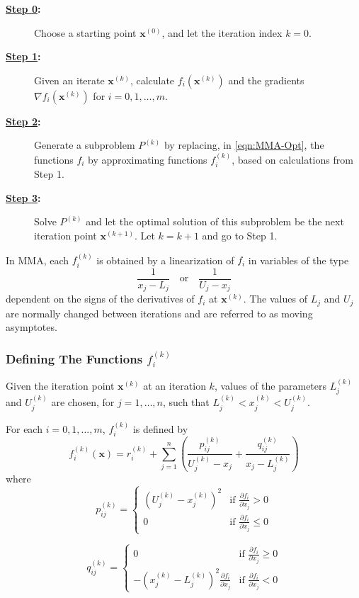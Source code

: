 \begin{description}
	\item[\textbf{\underline{Step 0}:}] Choose a starting point $\mathbf{x}^{(0)}$, and let the iteration index $k=0$.
	\item[\textbf{\underline{Step 1}:}] Given an iterate $\mathbf{x}^{(k)}$, calculate $f_i(\mathbf{x}^{(k)})$ and the gradients $\nabla f_i(\mathbf{x}^{(k)})$ for $i=0,1,\ldots,m$.
	\item[\textbf{\underline{Step 2}:}] Generate a subproblem $P^{(k)}$ by replacing, in \eqref{eqn:MMA-Opt}, the functions $f_i$ by approximating functions $f_i^{(k)}$, based on calculations from Step 1.
	\item[\textbf{\underline{Step 3}:}] Solve $P^{(k)}$ and let the optimal solution of this subproblem be the next iteration point $\mathbf{x}^{(k+1)}$. Let $k=k+1$ and go to Step 1.
\end{description}

In MMA, each $f_i^{(k)}$ is obtained by a linearization of $f_i$ in variables of the type $$\frac{1}{x_j-L_j}\quad\text{or}\quad\frac{1}{U_j-x_j}$$ dependent on the signs of the derivatives of $f_i$ at $\mathbf{x}^{(k)}$. The values of $L_j$ and $U_j$ are normally changed between iterations and are referred to as moving asymptotes.

\subsubsection*{Defining The Functions $f_i^{(k)}$}

Given the iteration point $\mathbf{x}^{(k)}$ at an iteration $k$, values of the parameters $L_j^{(k)}$ and $U_j^{(k)}$ are chosen, for $j=1,\ldots,n$, such that $L_j^{(k)}<x_j^{(k)}<U_j^{(k)}$.


For each $i=0,1,\ldots,m$, $f_i^{(k)}$ is defined by $$f_i^{(k)}(\mathbf{x})=r_i^{(k)}+\sum\limits_{j=1}^{n}\left(\frac{p_{ij}^{(k)}}{U_j^{(k)}-x_j}+\frac{q_{ij}^{(k)}}{x_j-L_j^{(k)}}\right)$$
where
$$p_{ij}^{(k)}=\begin{cases}
\left(U_j^{(k)}-x_j^{(k)}\right)^2 & \text{if }\frac{\partial f_i}{\partial x_j}>0\\
0 & \text{if }\frac{\partial f_i}{\partial x_j}\leq 0
\end{cases}$$
	
$$q_{ij}^{(k)}=\begin{cases}
0 & \text{if }\frac{\partial f_i}{\partial x_j}\geq 0\\
-\left(x_j^{(k)}-L_j^{(k)}\right)^2\frac{\partial f_i}{\partial x_j} & \text{if }\frac{\partial f_i}{\partial x_j}<0
\end{cases}$$
	
